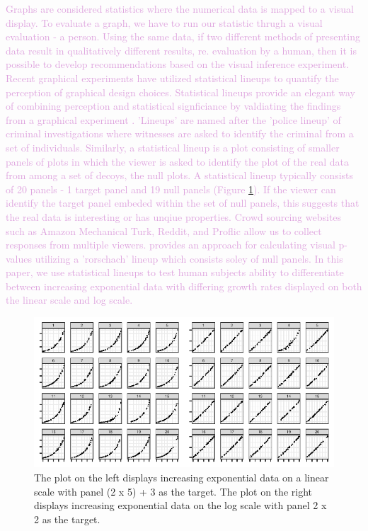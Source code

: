 \documentclass[]{interact}
\theoremstyle{plain}%
\theoremstyle{definition}
\theoremstyle{remark}
\begin{document}
\textcolor{Plum}{
Graphs are considered statistics where the numerical data is mapped to a visual display.
To evaluate a graph, we have to run our statistic thrugh a visual evaluation - a person. Using the same data, if two different methods of presenting data result in qualitatively different results, re. evaluation by a human, then it is possible to develop recommendations based on the visual inference experiment.  
Recent graphical experiments have utilized statistical lineups to quantify the perception of graphical design choices\citep{vanderplas_clusters_2017}. 
Statistical lineups provide an elegant way of combining perception and statistical signficiance by valdiating the findings from a graphical experiment \citep{buja_statistical_2009, wickham2010graphical, hofmann_graphical_2012, majumder_validation_2013, vanderplas_clusters_2017}.
'Lineups' are named after the 'police lineup' of criminal investigations where witnesses are asked to identify the criminal from a set of individuals. 
Similarly, a statistical lineup is a plot consisting of smaller panels of plots in which the viewer is asked to identify the plot of the real data from among a set of decoys, the null plots. 
A statistical lineup typically consists of 20 panels - 1 target panel and 19 null panels (Figure \ref{fig:lineup-example}). 
If the viewer can identify the target panel embeded within the set of null panels, this suggests that the real data is interesting or has unqiue properties.
Crowd sourcing websites such as Amazon Mechanical Turk, Reddit, and Proflic allow us to collect responses from multiple viewers.
\cite{vanderplas_statistical_nodate} provides an approach for calculating visual p-values utilizing a 'rorschach' lineup which consists soley of null panels.
In this paper, we use statistical lineups to test human subjects ability to differentiate between increasing exponential data with differing growth rates displayed on both the linear scale and log scale.
}

\begin{figure}

{\centering \includegraphics{jsm-2021-student-paper-submission_files/figure-latex/lineup-example-1} 

}

\caption{The plot on the left displays increasing exponential data on a linear scale with panel (2 x 5) + 3 as the target. The plot on the right displays increasing exponential data on the log scale with panel 2 x 2 as the target.}\label{fig:lineup-example}
\end{figure}
\end{document}
